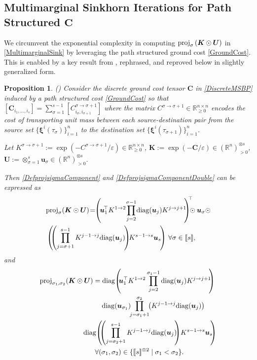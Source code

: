 \documentclass[letterpaper, 10pt, twocolumn]{ieeeconf}      %
\newtheorem{proposition}{Proposition}
\newcommand{\diag}{\mathrm{diag}}
\begin{document}
\subsection{Multimarginal Sinkhorn Iterations for Path Structured $\bm{C}$}\label{subsec:multiSink}
\noindent
We circumvent the exponential complexity in computing ${\rm{proj}}_{\sigma}\left(\bm{K}\odot\bm{U}\right)$ in \eqref{MultimarginalSink} by leveraging the path structured ground cost \eqref{GroundCost}. This is enabled by a key result from \cite{elvander2020multi}, rephrased, and reproved below in slightly generalized form. 
\begin{proposition}\label{PropMultiSinkPathCost}(\cite[Prop. 2]{elvander2020multi})
Consider the discrete ground cost tensor $\bm{C}$ in \eqref{DiscreteMSBP} induced by a path structured cost \eqref{GroundCost} so that $\left[\bm{C}_{i_{1},\hdots,i_{s}}\right] = \sum_{\sigma=1}^{s-1}\left[C_{i_{\sigma},i_{\sigma+1}}^{\sigma\rightarrow\sigma+1}\right]$ where the matrix $C^{\sigma\rightarrow\sigma+1}\in\mathbb{R}^{n\times n}_{\geq 0}$ encodes the cost of transporting unit mass between each source-destination pair from the source set $\{\bm{\xi}^{i}(\tau_{\sigma})\}_{i=1}^{n}$ to the destination set $\{\bm{\xi}^{i}(\tau_{\sigma+1})\}_{i=1}^{n}$.

Let $K^{\sigma\rightarrow\sigma+1}:=\exp(-C^{\sigma\rightarrow\sigma+1}/\varepsilon)\in\mathbb{R}^{n\times n}_{\geq 0}$, $\bm{K}:=\exp(-\bm{C}/\varepsilon)\in\left(\mathbb{R}^{n}\right)^{\otimes s}_{> 0}$, $\bm{U}:=\otimes_{\sigma=1}^{s}\bm{u}_{\sigma}\in\left(\mathbb{R}^{n}\right)^{\otimes s}_{> 0}$.

Then \eqref{DefprojsigmaComponent} and \eqref{DefprojsigmaComponentDouble} can be expressed as
\begin{align}
&{\rm{proj}}_{\sigma}\!\left(\bm{K}\odot\bm{U}\right)\!=\!\!\left(\!\bm{u}_1^{\!\top} K^{1\to2}\!\prod_{j=2}^{\sigma-1}\!\diag(\bm{u}_j)K^{j\to j+1}\!\!\right)^{\!\!\top}\!\!\!\!\odot\bm{u}_{\sigma}\odot \nonumber\\
&\left(\!\!\left(\prod_{j=\sigma+1}^{s-1}K^{j-1\to j}\diag(\bm{u}_j)\!\right)\!\!K^{s-1\to s}\bm{u}_s\!\right)\,\forall\sigma\in\llbracket s\rrbracket,\label{ProjSimplified}
\end{align}
and
\begin{align}
&{\rm{proj}}_{\sigma_1,\sigma_2}\!\left(\bm{K}\odot\bm{U}\right)=\diag\!\left(\!\!\bm{u}_1^\top K^{1\to2}\prod_{j=2}^{\sigma_1-1}\diag(\bm{u}_j)K^{j\to j+1}\!\!\right)\nonumber\\
&\qquad\qquad\qquad\qquad~~~\diag(\bm{u}_{\sigma_1})\!\!\prod_{j=\sigma_1+1}^{\sigma_2}\!\!\left(K^{j-1\to j}\diag(\bm{u}_j)\right)\nonumber\\
&\qquad\qquad\qquad~\diag\!\left(\!\!\left(\prod_{j=\sigma_2+1}^{s-1}K^{j-1\to j}\diag(\bm{u}_j)\!\!\right)\!K^{s-1\to s}\bm{u}_s\!\!\right)\nonumber\\
&\qquad\qquad\qquad\qquad\forall(\sigma_1,\sigma_2)\in\{\llbracket s\rrbracket^{\otimes 2}\mid\sigma_1 < \sigma_2\}.
\label{Proj2Simplified}
\end{align}
\end{proposition}
\end{document}
